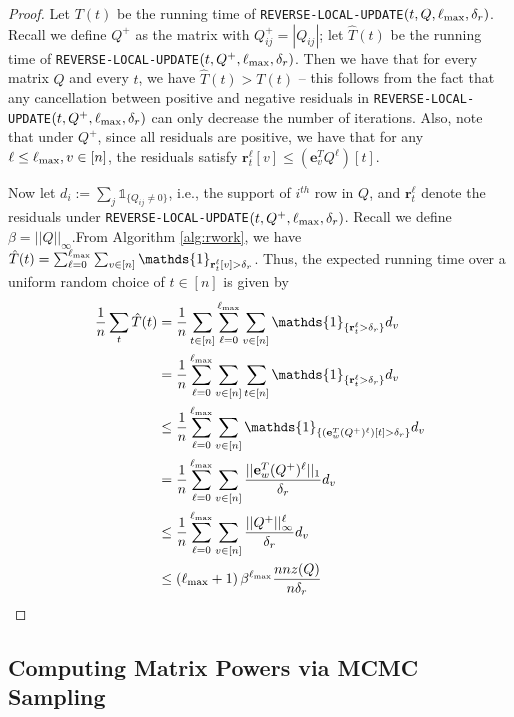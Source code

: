 \begin{proof}
Let $T(t)$ be the running time of \texttt{REVERSE-LOCAL-UPDATE}$(t,Q,\ell_{\max},\delta_r)$.
Recall we define $Q^+$ as the matrix with $Q^+_{ij} = |Q_{ij}|$; let $\hat{T}(t)$ be the running time of \texttt{REVERSE-LOCAL-UPDATE}$(t,Q^+,\ell_{\max},\delta_r)$. 
Then we have that for every matrix $Q$ and every $t$, we have $\hat{T}(t)>T(t)$ -- this follows from the fact that any cancellation between positive and negative residuals in \texttt{REVERSE-LOCAL-UPDATE}$(t,Q^+,\ell_{\max},\delta_r)$ can only decrease the number of iterations. 
Also, note that under $Q^+$, since all residuals are positive, we have that for any $\ell\leq\ell_{\max},v\in[n]$, the residuals satisfy $\mathbf{r}_t^{\ell}[v]\leq \left(\mathbf{e}_v^TQ^\ell\right)[t]$.

Now let $d_i := \sum_j\mathds{1}_{\{Q_{ij}\neq 0\}}$, i.e., the support of $i^{th}$ row in $Q$, and $\mathbf{r}_t^{\ell}$ denote the residuals under \texttt{REVERSE-LOCAL-UPDATE}$(t,Q^+,\ell_{\max},\delta_r)$. 
Recall we define $\beta = ||Q||_{\infty}$.From Algorithm \ref{alg:rwork}, we have $\hat{T}(t) = \sum_{\ell=0}^{\lm}\sum_{v\in[n]}\mathds{1}_{\mathbf{r}_t^{\ell}[v]>\delta_r}$.
Thus, the expected running time over a uniform random choice of $t\in[n]$ is given by
\begin{align*}
\frac{1}{n}\sum_t\hat{T}(t) &= \frac{1}{n}\sum_{t\in[n]}\sum_{\ell=0}^{\lm}\sum_{v\in[n]}\mathds{1}_{\{\mathbf{r}_t^{\ell}>\delta_r\}}d_v\\
&=\frac{1}{n}\sum_{\ell=0}^{\lm}\sum_{v\in[n]}\sum_{t\in[n]}\mathds{1}_{\{\mathbf{r}_t^{\ell}>\delta_r\}}d_v\\
&\leq\frac{1}{n}\sum_{\ell=0}^{\lm}\sum_{v\in[n]} \mathds{1}_{\{\left(\mathbf{e}_w^T(Q^+)^\ell\right)[t]>\delta_r\}}d_v\\
&=\frac{1}{n}\sum_{\ell=0}^{\lm}\sum_{v\in[n]} \frac{||\mathbf{e}_w^T(Q^+)^\ell||_1}{\delta_r}d_v\\
&\leq\frac{1}{n}\sum_{\ell=0}^{\lm}\sum_{v\in[n]} \frac{||Q^+||_{\infty}^\ell}{\delta_r}d_v\\
&\leq\left(\lm+1\right)\beta^{\lm} \frac{nnz(Q)}{n\delta_r}
\end{align*}
\end{proof}


\subsection{Computing Matrix Powers via MCMC Sampling}
\label{ssec:forwardwork}


